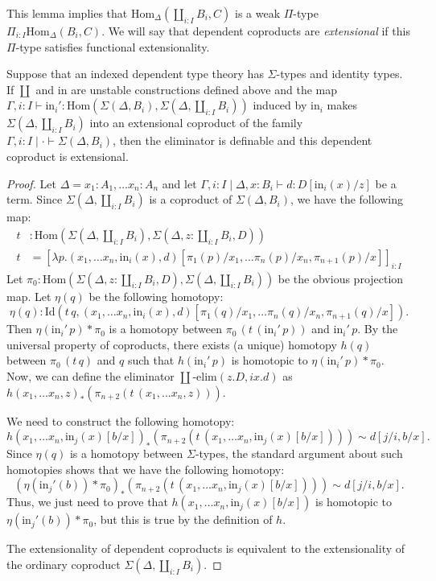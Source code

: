 \documentclass[reqno]{amsart}
\theoremstyle{definition}
\theoremstyle{remark}
\newcommand{\fs}[1]{\mathrm{#1}}
\newcommand{\Hom}{\fs{Hom}}
\newcommand{\Id}{\fs{Id}}
\numberwithin{figure}{section}
\begin{document}
This lemma implies that $\Hom_\Delta(\coprod_{i : I} B_i, C)$ is a weak $\Pi$-type $\Pi_{i : I} \Hom_\Delta(B_i,C)$.
We will say that dependent coproducts are \emph{extensional} if this $\Pi$-type satisfies functional extensionality.

\begin{lem}
Suppose that an indexed dependent type theory has $\Sigma$-types and identity types.
If $\coprod$ and $\fs{in}$ are unstable constructions defined above and the map $\Gamma, i : I \vdash \fs{in}_i' : \Hom(\Sigma(\Delta,B_i), \Sigma(\Delta, \coprod_{i : I} B_i))$ induced by $\fs{in}_i$ makes $\Sigma(\Delta, \coprod_{i : I} B_i)$ into an extensional coproduct of the family $\Gamma, i : I \mid \cdot \vdash \Sigma(\Delta,B_i)$,
then the eliminator is definable and this dependent coproduct is extensional.
\end{lem}
\begin{proof}
Let $\Delta = x_1 : A_1, \ldots x_n : A_n$ and let $\Gamma, i : I \mid \Delta, x : B_i \vdash d : D[\fs{in}_i(x)/z]$ be a term.
Since $\Sigma(\Delta, \coprod_{i : I} B_i)$ is a coproduct of $\Sigma(\Delta, B_i)$, we have the following map:
\begin{align*}
t & : \Hom(\Sigma(\Delta, \coprod_{i : I} B_i), \Sigma(\Delta, z : \coprod_{i : I} B_i, D)) \\
t & = [\lambda p.(x_1, \ldots x_n, \fs{in}_i(x), d)[\pi_1(p)/x_1, \ldots \pi_n(p)/x_n, \pi_{n+1}(p)/x]]_{i : I}
\end{align*}
Let $\pi_0 : \Hom(\Sigma(\Delta, z : \coprod_{i : I} B_i, D), \Sigma(\Delta, \coprod_{i : I} B_i))$ be the obvious projection map.
Let $\eta(q)$ be the following homotopy:
\[ \eta(q) : \Id(t\,q, (x_1, \ldots x_n, \fs{in}_i(x), d)[\pi_1(q)/x_1, \ldots \pi_n(q)/x_n, \pi_{n+1}(q)/x]). \]
Then $\eta(\fs{in}_i'\,p) * \pi_0$ is a homotopy between $\pi_0\,(t\,(\fs{in}_i'\,p))$ and $\fs{in}_i'\,p$.
By the universal property of coproducts, there exists (a unique) homotopy $h(q)$ between $\pi_0\,(t\,q)$ and $q$ such that $h(\fs{in}_i'\,p)$ is homotopic to $\eta(\fs{in}_i'\,p) * \pi_0$.
Now, we can define the eliminator $\coprod\text{-}\fs{elim}(z.D, i x.d)$ as $h(x_1, \ldots x_n, z)_*(\pi_{n+2}(t\,(x_1, \ldots x_n, z)))$.

We need to construct the following homotopy:
\[ h(x_1, \ldots x_n, \fs{in}_j(x)[b/x])_*(\pi_{n+2}(t\,(x_1, \ldots x_n, \fs{in}_j(x)[b/x]))) \sim d[j/i,b/x]. \]
Since $\eta(q)$ is a homotopy between $\Sigma$-types, the standard argument about such homotopies shows that we have the following homotopy:
\[ (\eta(\fs{in}_j'(b)) * \pi_0)_*(\pi_{n+2}(t\,(x_1, \ldots x_n, \fs{in}_j(x)[b/x]))) \sim d[j/i,b/x]. \]
Thus, we just need to prove that $h(x_1, \ldots x_n, \fs{in}_j(x)[b/x])$ is homotopic to $\eta(\fs{in}_j'(b)) * \pi_0$, but this is true by the definition of $h$.

The extensionality of dependent coproducts is equivalent to the extensionality of the ordinary coproduct $\Sigma(\Delta, \coprod_{i : I} B_i)$.
\end{proof}
\end{document}
